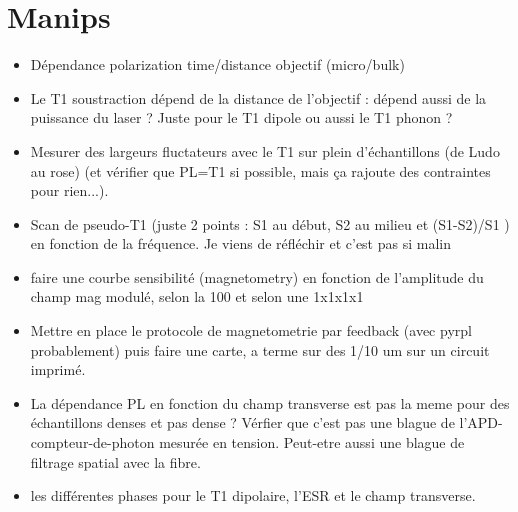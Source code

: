 \documentclass[a4paper]{report}
\begin{document}
 \section{Manips}
 \begin{itemize}
 \item Dépendance polarization time/distance objectif (micro/bulk)
 \item Le T1 soustraction dépend de la distance de l'objectif : dépend aussi de la puissance du laser ? Juste pour le T1 dipole ou aussi le T1 phonon ?
 \item Mesurer des largeurs fluctateurs avec le T1 sur plein d'échantillons (de Ludo au rose) (et vérifier que PL=T1 si possible, mais ça rajoute des contraintes pour rien...).
 \item Scan de pseudo-T1 (juste 2 points : S1 au début, S2 au milieu et (S1-S2)/S1 ) en fonction de la fréquence. Je viens de réfléchir et c'est pas si malin

 \item faire une courbe sensibilité (magnetometry) en fonction de l'amplitude du champ mag modulé, selon la 100 et selon une 1x1x1x1
 \item Mettre en place le protocole de magnetometrie par feedback (avec pyrpl probablement) puis faire une carte, a terme sur des 1/10 um sur un circuit imprimé.
 \item La dépendance PL en fonction du champ transverse est pas la meme pour des échantillons denses et pas dense ? Vérfier que c'est pas une blague de l'APD-compteur-de-photon mesurée en tension. Peut-etre aussi une blague de filtrage spatial avec la fibre.
 \item les différentes phases pour le T1 dipolaire, l'ESR et le champ transverse.
 \end{itemize}
 
\end{document}

